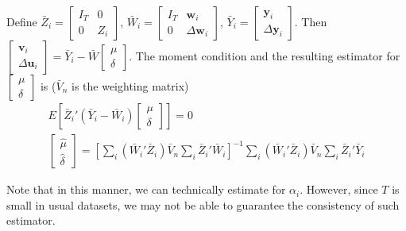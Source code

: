 \documentclass[12pt]{article}
\theoremstyle{definition}
\theoremstyle{property}
\theoremstyle{assumption}
\theoremstyle{example}
\theoremstyle{comment}
\begin{document}
Define \small{$\bar{Z}_i = \begin{bmatrix}I_T & 0 \\ 0 & Z_i\end{bmatrix}$, $\bar{W}_i=\begin{bmatrix}I_T & \mathbf{w}_i \\ 0 & \Delta\mathbf{w}_i\end{bmatrix}$, $\bar{Y}_i = \begin{bmatrix} \mathbf{y}_i \\ \Delta \mathbf{y}_i\end{bmatrix}$}\normalsize. Then $\begin{bmatrix}\mathbf{v}_i \\ \Delta\mathbf{u}_i \end{bmatrix}=\bar{Y}_i - \bar{W}\begin{bmatrix}\mu \\ \delta\end{bmatrix}$. The moment condition and the resulting estimator for $\begin{bmatrix}\mu \\ \delta\end{bmatrix}$ is ($\bar{V}_n$ is the weighting matrix)
\footnotesize{\begin{gather*}
E\left[\bar{Z}_i'(\bar{Y}_i-\bar{W}_i)\begin{bmatrix}\mu \\ \delta\end{bmatrix}\right]=0\\
\begin{bmatrix}\hat{\mu} \\ \hat{\delta}\end{bmatrix}=\left[\sum_i(\bar{W}_i'\bar{Z}_i)\bar{V}_n\sum_i \bar{Z}_i'\bar{W}_i\right]^{-1}\sum_i(\bar{W}_i'\bar{Z}_i)\bar{V}_n\sum_i \bar{Z}_i'\bar{Y}_i
\end{gather*}}\normalsize\par
Note that in this manner, we can technically estimate for $\alpha_i$. However, since $T$ is small in usual datasets, we may not be able to guarantee the consistency of such estimator. 
\end{document}
